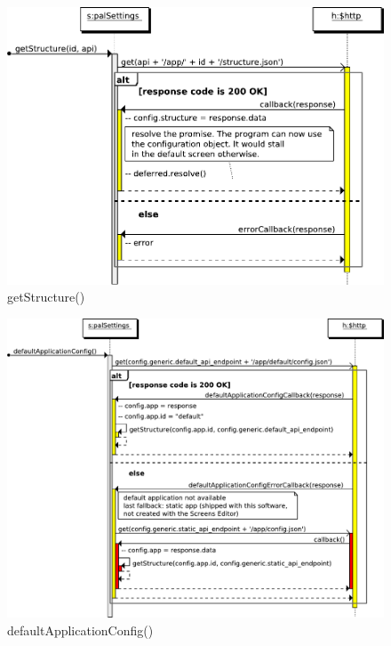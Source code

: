 \begin{figure}[htb]
    \centering
    \includegraphics{figures/design/seqdia/palSettings-getStructure.pdf}
    \caption{getStructure()}
    \label{fig:design-seqdia-palSettings-getStructure}
\end{figure}

\begin{figure}
    \centering
    \includegraphics{figures/design/seqdia/palSettings-defaultApplicationConfig.pdf}
    \caption{defaultApplicationConfig()}
    \label{fig:design-seqdia-palSettings-defaultApplicationConfig}
\end{figure}

\FloatBarrier

